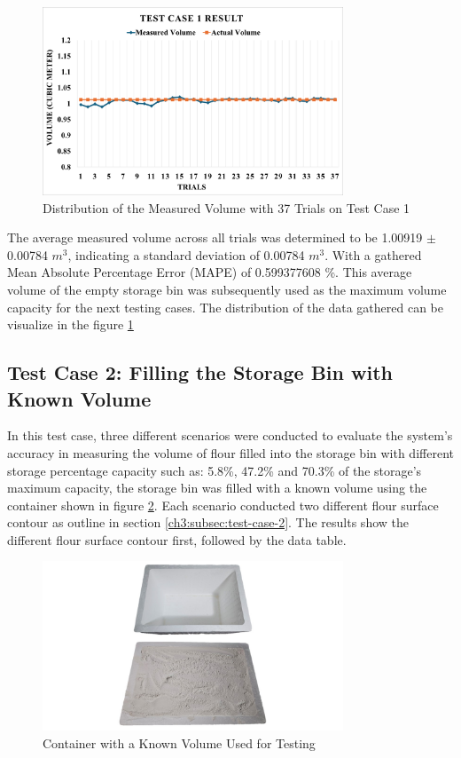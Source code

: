 \begin{figure}[H]
	\centering
	\includegraphics[width=0.8\textwidth]{Figures/test-case-1-graph}
	\caption{Distribution of the Measured Volume with 37 Trials on Test Case 1}
	\label{ch4:fig:test-case-1-graph}
\end{figure}

The average measured volume across all trials was determined to be 1.00919 $\pm$ 0.00784 $m^{3}$, indicating a standard deviation of 0.00784 $m^{3}$. With a gathered Mean Absolute Percentage Error (MAPE) of 0.599377608 \%. This average volume of the empty storage bin was subsequently used as the maximum volume capacity for the next testing cases. The distribution of the data gathered can be visualize in the figure \ref{ch4:fig:test-case-1-graph}

\subsection{Test Case 2: Filling the Storage Bin with Known Volume}

In this test case, three different scenarios were conducted to evaluate the system's accuracy in measuring the volume of flour filled into the storage bin with different storage percentage capacity such as: 5.8\%, 47.2\% and 70.3\% of the storage's maximum capacity, the storage bin was filled with a known volume using the container shown in figure \ref{ch4:fig:known-volume}. Each scenario conducted two different flour surface contour as outline in section \ref{ch3:subsec:test-case-2}. The results show the different flour surface contour first, followed by the data table.

\begin{figure}[H]
	\centering
	\includegraphics[width=0.8\textwidth]{Figures/known-volume}
	\caption{Container with a Known Volume Used for Testing}
	\label{ch4:fig:known-volume}
\end{figure}


